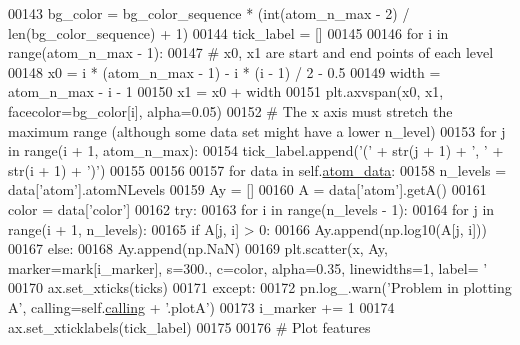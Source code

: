 \begin{DoxyCode}
00143         bg\_color = bg\_color\_sequence * (int(atom\_n\_max - 2) / len(bg\_color\_sequence) + 1)
00144         tick\_label = []
00145         
00146         \textcolor{keywordflow}{for} i \textcolor{keywordflow}{in} range(atom\_n\_max - 1):
00147             \textcolor{comment}{# x0, x1 are start and end points of each level}
00148             x0 = i * (atom\_n\_max - 1) - i * (i - 1) / 2 - 0.5
00149             width = atom\_n\_max - i - 1
00150             x1 = x0 + width
00151             plt.axvspan(x0, x1, facecolor=bg\_color[i], alpha=0.05)
00152             \textcolor{comment}{# The x axis must stretch the maximum range (although some data set might have a lower n\_level)}
00153             \textcolor{keywordflow}{for} j \textcolor{keywordflow}{in} range(i + 1, atom\_n\_max):
00154                 tick\_label.append(\textcolor{stringliteral}{'('} + str(j + 1) + \textcolor{stringliteral}{', '} + str(i + 1) + \textcolor{stringliteral}{')'})
00155 
00156 
00157         \textcolor{keywordflow}{for} data \textcolor{keywordflow}{in} self.\hyperlink{classpyneb_1_1plot_1_1plot_atomic_data_1_1_data_plot_aee33ad460a38cb4293a5bd89cec12294}{atom\_data}:
00158             n\_levels = data[\textcolor{stringliteral}{'atom'}].atomNLevels
00159             Ay = []
00160             A = data[\textcolor{stringliteral}{'atom'}].getA()
00161             color = data[\textcolor{stringliteral}{'color'}]
00162             \textcolor{keywordflow}{try}:
00163                 \textcolor{keywordflow}{for} i \textcolor{keywordflow}{in} range(n\_levels - 1):
00164                     \textcolor{keywordflow}{for} j \textcolor{keywordflow}{in} range(i + 1, n\_levels):
00165                         \textcolor{keywordflow}{if} A[j, i] > 0:
00166                             Ay.append(np.log10(A[j, i]))
00167                         \textcolor{keywordflow}{else}:
00168                             Ay.append(np.NaN)
00169                 plt.scatter(x, Ay, marker=mark[i\_marker], s=300., c=color, alpha=0.35, linewidths=1, label=\textcolor{stringliteral}{
      '%
00170                 ax.set\_xticks(ticks)
00171             \textcolor{keywordflow}{except}:
00172                 pn.log\_.warn(\textcolor{stringliteral}{'Problem in plotting A'}, calling=self.\hyperlink{classpyneb_1_1plot_1_1plot_atomic_data_1_1_data_plot_a393a133b607541c57d5ebc5a34687e3f}{calling} + \textcolor{stringliteral}{'.plotA'})
00173             i\_marker += 1
00174         ax.set\_xticklabels(tick\_label)
00175 
00176         \textcolor{comment}{# Plot features}
}
\end{DoxyCode}
